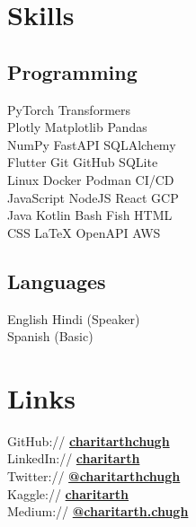 \documentclass[]{resume-template}
\begin{document}
\begin{minipage}[t]{0.33\textwidth}
        \section{Skills}\label{sec:skills}

        \subsection{Programming}\label{subsec:programming}
        PyTorch \textbullet{} Transformers \textbullet{} \\
        Plotly \textbullet{} Matplotlib \textbullet{} Pandas \textbullet{}\\
        NumPy \textbullet{} FastAPI \textbullet SQLAlchemy \\ %
        Flutter \textbullet{} Git \textbullet{} GitHub \textbullet{} SQLite \textbullet{}\\
        Linux \textbullet Docker \textbullet Podman \textbullet {} CI/CD \\
        JavaScript \textbullet{} NodeJS \textbullet{} React \textbullet{} GCP\\
        Java \textbullet{} Kotlin \textbullet{} Bash \textbullet{} Fish \textbullet{} HTML \textbullet{}\\
        CSS \textbullet{} \LaTeX \textbullet{} OpenAPI \textbullet{} AWS %
        \vspace{\topsep}

        \subsection{Languages}
        English \textbullet{} Hindi (Speaker)\\
        Spanish (Basic)


        \section{Links}\label{sec:links}
        GitHub:// \href{https://github.com/charitarthchugh}{\textbf {charitarthchugh}} \\
        LinkedIn:// \href{https:///www.linkedin.com/in/charitarth}{\textbf {charitarth}} \\
        Twitter:// \href{https://twitter.com/charitarthchugh}{\textbf{@charitarthchugh}}\\
        Kaggle:// \href{https://kaggle.com/charitarth}{\textbf{charitarth}}\\
        Medium:// \href{https://medium.com/@charitarth.chugh}{\textbf{@charitarth.chugh}}\\

    \end{minipage}
\end{document}
